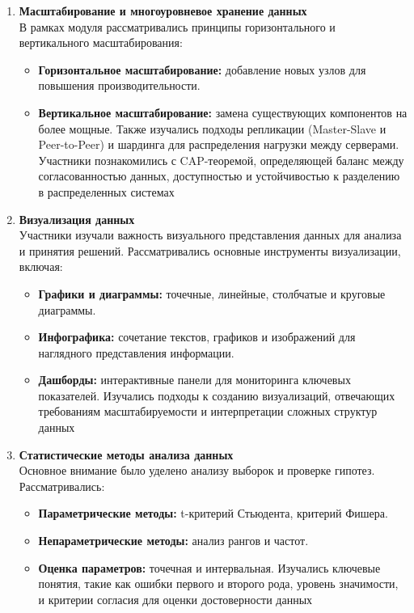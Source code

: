 \documentclass[a4paper, final]{article}
\begin{document}
\begin{enumerate}
  \item \textbf{Масштабирование и многоуровневое хранение данных}\\
В рамках модуля рассматривались принципы горизонтального и вертикального масштабирования:
    \begin{itemize}
      \item \textbf{Горизонтальное масштабирование:} добавление новых узлов для повышения производительности.
      \item \textbf{Вертикальное масштабирование:} замена существующих компонентов на более мощные. Также изучались подходы репликации (Master-Slave и Peer-to-Peer) и шардинга для распределения нагрузки между серверами. Участники познакомились с CAP-теоремой, определяющей баланс между согласованностью данных, доступностью и устойчивостью к разделению в распределенных системах
    \end{itemize}

  \item \textbf{Визуализация данных}\\
Участники изучали важность визуального представления данных для анализа и принятия решений. Рассматривались основные инструменты визуализации, включая:
    \begin{itemize}
      \item \textbf{Графики и диаграммы:} точечные, линейные, столбчатые и круговые диаграммы.
      \item \textbf{Инфографика:} сочетание текстов, графиков и изображений для наглядного представления информации.
      \item \textbf{Дашборды:} интерактивные панели для мониторинга ключевых показателей. Изучались подходы к созданию визуализаций, отвечающих требованиям масштабируемости и интерпретации сложных структур данных 
    \end{itemize}

  \item \textbf{Статистические методы анализа данных}\\
Основное внимание было уделено анализу выборок и проверке гипотез. Рассматривались:
    \begin{itemize}
      \item \textbf{Параметрические методы:} t-критерий Стьюдента, критерий Фишера.
      \item \textbf{Непараметрические методы:} анализ рангов и частот.
      \item \textbf{Оценка параметров:} точечная и интервальная. Изучались ключевые понятия, такие как ошибки первого и второго рода, уровень значимости, и критерии согласия для оценки достоверности данных
    \end{itemize}


\end{enumerate}
\end{document}
